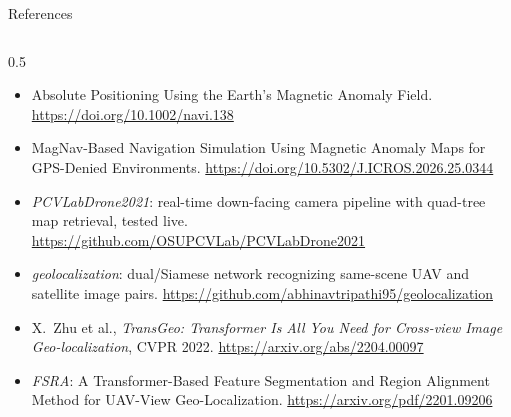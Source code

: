\documentclass[compress,aspectratio=169]{beamer}
\begin{document}
\begin{frame}[t]{References}
\begin{columns}[t,onlytextwidth]
\begin{column}{0.5\textwidth}
\begin{itemize}
\item[{[10]}] Absolute Positioning Using the Earth's Magnetic Anomaly Field. \url{https://doi.org/10.1002/navi.138}
\item[{[11]}] MagNav-Based Navigation Simulation Using Magnetic Anomaly Maps for GPS-Denied Environments. \url{https://doi.org/10.5302/J.ICROS.2026.25.0344}
\item[{[12]}] \emph{PCVLabDrone2021}: real-time down-facing camera pipeline with quad-tree map retrieval, tested live. \url{https://github.com/OSUPCVLab/PCVLabDrone2021}
\item[{[13]}] \emph{geolocalization}: dual/Siamese network recognizing same-scene UAV and satellite image pairs. \url{https://github.com/abhinavtripathi95/geolocalization}
\item[{[14]}] X.~Zhu et al., \emph{TransGeo: Transformer Is All You Need for Cross-view Image Geo-localization}, CVPR 2022. \url{https://arxiv.org/abs/2204.00097}
\item[{[15]}] \emph{FSRA}: A Transformer-Based Feature Segmentation and Region Alignment Method for UAV-View Geo-Localization. \url{https://arxiv.org/pdf/2201.09206}
\end{itemize}
\end{column}
\end{columns}
\end{frame}
\end{document}
